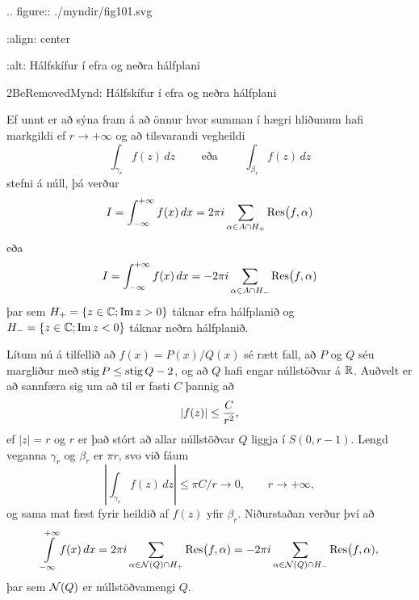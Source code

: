 .. figure:: ./myndir/fig101.svg

    :align: center

    :alt: Hálfskífur í efra og neðra hálfplani

    2BeRemovedMynd: Hálfskífur í efra og neðra hálfplani


\noindent
Ef unnt er að sýna fram á að önnur hvor summan í hægri hliðunum hafi
markgildi ef $r\to +\infty$ og að tilsvarandi vegheildi
 $$\int_{\gamma_r}f(z)\, dz \qquad \text{ eða }
\qquad \int_{\beta_r}f(z)\, dz 
 $$
stefni á núll, þá verður
 $$I=\int_{-\infty}\sp{+\infty}f(x)\, dx =
2\pi i\sum_{\alpha\in A\cap H_+}{\operatorname{Res}}\big(f,\alpha)
 $$
eða
 $$I=\int_{-\infty}\sp{+\infty}f(x)\, dx =
-2\pi i\sum_{\alpha\in A\cap H_-}{\operatorname{Res}}\big(f,\alpha)
 $$
þar sem $H_+=\{z\in {\mathbb C}; {\operatorname{Im\, }} z>0\}$ táknar efra hálfplanið
og $H_-=\{z\in {\mathbb C}; {\operatorname{Im\, }} z<0\}$ táknar neðra hálfplanið.

Lítum nú á tilfellið að $f(x)=P(x)/Q(x)$ sé rætt fall, að $P$ og $Q$ séu
margliður  með ${\operatorname{stig}}\, P\leq {\operatorname{stig}}\, Q-2$, og að $Q$ hafi engar
núllstöðvar á ${\mathbb R}$.  Auðvelt er að sannfæra sig um að til er fasti
$C$ þannig að
 $$
|f(z)|\leq \dfrac C{r\sp 2},
 $$
ef $|z|=r$ og $r$ er það stórt að allar núllstöðvar $Q$ liggja í
$S(0,r-1)$.  Lengd veganna $\gamma_r$ og $\beta_r$ er $\pi r$, svo
við fáum 
 $$|\int_{\gamma_r}f(z)\, dz|\leq \pi C/r\to 0, \qquad r\to +\infty,
 $$
og sama mat fæst fyrir heildið af $f(z)$ yfir $\beta_r$.  Niðurstaðan
verður því að 
 $$\int\limits_{-\infty}\sp {+\infty} f(x)\, dx =
2\pi i\sum_{\alpha\in {\cal N}(Q)\cap H_+}{\operatorname{Res}}\big(f,\alpha)
=-2\pi i\sum_{\alpha\in {\cal N}(Q)\cap H_-}{\operatorname{Res}}\big(f,\alpha),
 $$
þar sem ${\cal N}(Q)$ er núllstöðvamengi $Q$. 

